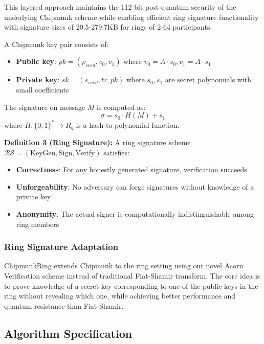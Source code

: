 \documentclass[11pt,a4paper]{article}
\begin{document}
This layered approach maintains the 112-bit post-quantum security of the underlying Chipmunk scheme while enabling efficient ring signature functionality with signature sizes of 20.5-279.7KB for rings of 2-64 participants.

A Chipmunk key pair consists of:
\begin{itemize}
\item \textbf{Public key}: $pk = (\rho_{seed}, v_0, v_1)$ where $v_0 = A \cdot s_0, v_1 = A \cdot s_1$
\item \textbf{Private key}: $sk = (s_{seed}, tr, pk)$ where $s_0, s_1$ are secret polynomials with small coefficients
\end{itemize}

The signature on message $M$ is computed as:
\begin{equation}
\sigma = s_0 \cdot H(M) + s_1
\end{equation}
where $H: \{0,1\}^* \rightarrow R_q$ is a hash-to-polynomial function.

\textbf{Definition 3 (Ring Signature):} A ring signature scheme $\mathcal{RS} = (\text{KeyGen}, \text{Sign}, \text{Verify})$ satisfies:
\begin{itemize}
\item \textbf{Correctness}: For any honestly generated signature, verification succeeds
\item \textbf{Unforgeability}: No adversary can forge signatures without knowledge of a private key
\item \textbf{Anonymity}: The actual signer is computationally indistinguishable among ring members
\end{itemize}

\subsubsection{Ring Signature Adaptation}

ChipmunkRing extends Chipmunk to the ring setting using our novel Acorn Verification scheme instead of traditional Fiat-Shamir transform. The core idea is to prove knowledge of a secret key corresponding to one of the public keys in the ring without revealing which one, while achieving better performance and quantum resistance than Fiat-Shamir.

\subsection{Algorithm Specification}
\end{document}
